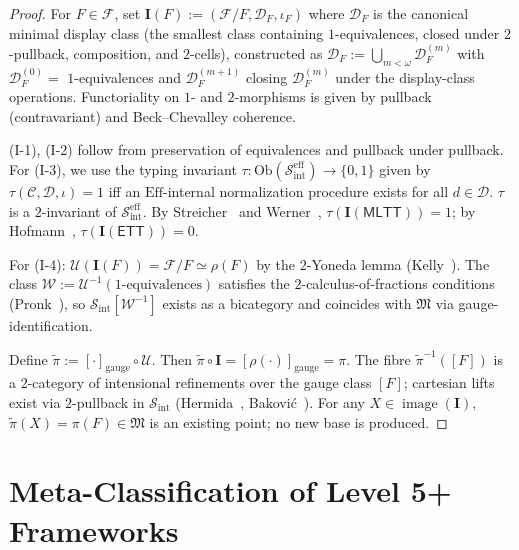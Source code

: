 \documentclass[11pt]{article}
\theoremstyle{plain}
\theoremstyle{definition}
\newcommand{\cS}{\mathcal{S}}
\newcommand{\cF}{\mathcal{F}}
\newcommand{\cC}{\mathcal{C}}
\newcommand{\cD}{\mathcal{D}}
\newcommand{\cU}{\mathcal{U}}
\newcommand{\cW}{\mathcal{W}}
\newcommand{\fM}{\mathfrak{M}}
\newcommand{\Sint}{\cS_{\mathrm{int}}}
\newcommand{\Ob}{\mathrm{Ob}}
\newcommand{\MLTT}{\mathsf{MLTT}}
\newcommand{\ETT}{\mathsf{ETT}}
\newcommand{\II}{\mathbf{I}}
\DeclareMathOperator{\image}{image}
\begin{document}
\begin{proof}
For $F \in \cF$, set $\II(F) := (\cF / F, \cD_F, \iota_F)$ where $\cD_F$ is the canonical minimal display class (the smallest class containing $1$-equivalences, closed under $2$-pullback, composition, and $2$-cells), constructed as $\cD_F := \bigcup_{m < \omega} \cD_F^{(m)}$ with $\cD_F^{(0)} = $ $1$-equivalences and $\cD_F^{(m+1)}$ closing $\cD_F^{(m)}$ under the display-class operations. Functoriality on $1$- and $2$-morphisms is given by pullback (contravariant) and Beck--Chevalley coherence.

(I-1), (I-2) follow from preservation of equivalences and pullback under pullback. For (I-3), we use the typing invariant $\tau : \Ob(\Sint^{\mathrm{eff}}) \to \{0, 1\}$ given by $\tau(\cC, \cD, \iota) = 1$ iff an $\mathrm{Eff}$-internal normalization procedure exists for all $d \in \cD$. $\tau$ is a $2$-invariant of $\Sint^{\mathrm{eff}}$. By Streicher~\cite{Streicher1991} and Werner~\cite{Werner1994}, $\tau(\II(\MLTT)) = 1$; by Hofmann~\cite{Hofmann1995}, $\tau(\II(\ETT)) = 0$.

For (I-4): $\cU(\II(F)) = \cF / F \simeq \rho(F)$ by the $2$-Yoneda lemma (Kelly~\cite{Kelly1982}). The class $\cW := \cU^{-1}(\text{$1$-equivalences})$ satisfies the $2$-calculus-of-fractions conditions (Pronk~\cite{Pronk1996}), so $\Sint[\cW^{-1}]$ exists as a bicategory and coincides with $\fM$ via gauge-identification.

Define $\widetilde{\pi} := [\cdot]_{\mathrm{gauge}} \circ \cU$. Then $\widetilde{\pi} \circ \II = [\rho(\cdot)]_{\mathrm{gauge}} = \pi$. The fibre $\widetilde{\pi}^{-1}([F])$ is a $2$-category of intensional refinements over the gauge class $[F]$; cartesian lifts exist via $2$-pullback in $\Sint$ (Hermida~\cite{Hermida1999}, Bakovi\'c~\cite{Bakovic2010}). For any $X \in \image(\II)$, $\widetilde{\pi}(X) = \pi(F) \in \fM$ is an existing point; no new base is produced.
\end{proof}

\section{Meta-Classification of Level 5+ Frameworks}\label{sec:meta}
\end{document}
